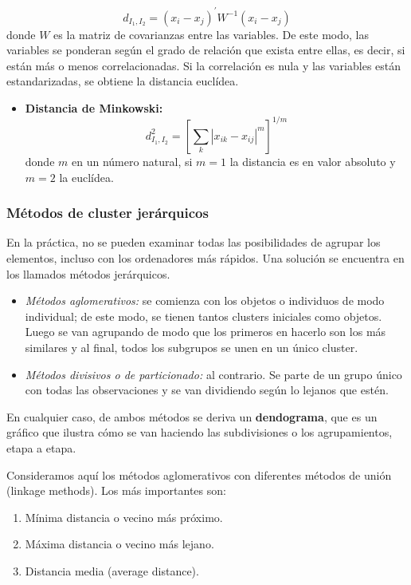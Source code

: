 \documentclass[]{article}
\def\tightlist{}
\numberwithin{equation}{section}
\begin{document}
\[
        d_{I_1,I_2} = (x_i - x_j)^{\prime} W^{-1} (x_i - x_j)
  \] donde \(W\) es la matriz de covarianzas entre las variables. De
este modo, las variables se ponderan según el grado de relación que
exista entre ellas, es decir, si están más o menos correlacionadas. Si
la correlación es nula y las variables están estandarizadas, se obtiene
la distancia euclídea.

\begin{itemize}
\tightlist
\item
  \textbf{Distancia de Minkowski:} \[
    d_{I_1,I_2}^2 = \left[ \sum_{k} |x_{ik} - x_{ij} |^m \right]^{1/m}
    \] donde \(m\) en un número natural, si \(m=1\) la distancia es en
  valor absoluto y \(m=2\) la euclídea.
\end{itemize}

\subsubsection{Métodos de cluster
jerárquicos}\label{metodos-de-cluster-jerarquicos}

En la práctica, no se pueden examinar todas las posibilidades de agrupar
los elementos, incluso con los ordenadores más rápidos. Una solución se
encuentra en los llamados métodos jerárquicos.

\begin{itemize}
\item
  \emph{Métodos aglomerativos:} se comienza con los objetos o individuos
  de modo individual; de este modo, se tienen tantos clusters iniciales
  como objetos. Luego se van agrupando de modo que los primeros en
  hacerlo son los más similares y al final, todos los subgrupos se unen
  en un único cluster.
\item
  \emph{Métodos divisivos o de particionado:} al contrario. Se parte de
  un grupo único con todas las observaciones y se van dividiendo según
  lo lejanos que estén.
\end{itemize}

En cualquier caso, de ambos métodos se deriva un \textbf{dendograma},
que es un gráfico que ilustra cómo se van haciendo las subdivisiones o
los agrupamientos, etapa a etapa.

Consideramos aquí los métodos aglomerativos con diferentes métodos de
unión (linkage methods). Los más importantes son:

\begin{enumerate}
\def\labelenumi{\arabic{enumi}.}
\item
  Mínima distancia o vecino más próximo.
\item
  Máxima distancia o vecino más lejano.
\item
  Distancia media (average distance).
\end{enumerate}
\end{document}
